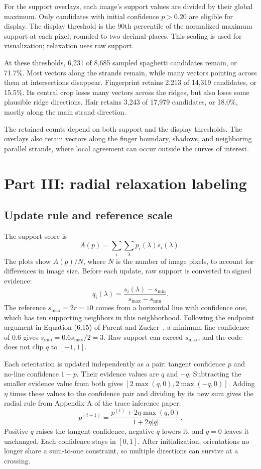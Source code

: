 \documentclass[10pt,letterpaper]{article}
\begin{document}
For the support overlays, each image's support values are divided by their
global maximum. Only candidates with initial confidence $p>0.20$ are eligible
for display. The display threshold is the 90th percentile of the normalized
maximum support at each pixel, rounded to two decimal places. This scaling
is used for visualization; relaxation uses raw support.

At these thresholds, 6,231 of 8,685 sampled spaghetti candidates remain,
or 71.7\%. Most vectors along the strands remain, while many vectors pointing
across them at intersections disappear. Fingerprint retains 2,213 of 14,319
candidates, or 15.5\%. Its central crop loses many vectors across the ridges,
but also loses some plausible ridge directions. Hair retains 3,243 of 17,979
candidates, or 18.0\%, mostly along the main strand direction.

The retained counts depend on both support and the display thresholds.
The overlays also retain vectors along the finger boundary, shadows, and
neighboring parallel strands, where local agreement can occur outside the
curves of interest.

\section{Part III: radial relaxation labeling}
\subsection{Update rule and reference scale}
The support score is
\begin{equation}
A(p)=\sum_i\sum_\lambda p_i(\lambda)s_i(\lambda).
\end{equation}
The plots show $A(p)/N$, where $N$ is the number of image pixels, to account
for differences in image size. Before each update, raw support is converted
to signed evidence:
\begin{equation}
q_i(\lambda)=\frac{s_i(\lambda)-s_{\min}}{s_{\max}-s_{\min}}.
\end{equation}
The reference $s_{\max}=2r=10$ comes from a horizontal line with confidence
one, which has ten supporting neighbors in this neighborhood. Following the
endpoint argument in Equation (6.15) of Parent and Zucker~\cite{parent1989},
a minimum line confidence of $0.6$ gives $s_{\min}=0.6s_{\max}/2=3$.
Raw support can exceed $s_{\max}$, and the code does not clip $q$ to $[-1,1]$.

Each orientation is updated independently as a pair: tangent confidence $p$
and no-line confidence $1-p$. Their evidence values are $q$ and $-q$.
Subtracting the smaller evidence value from both gives
$[2\max(q,0),2\max(-q,0)]$. Adding $\eta$ times these values to the confidence
pair and dividing by its new sum gives the radial rule from Appendix A of
the trace inference paper:
\begin{equation}
p^{(t+1)}=\frac{p^{(t)}+2\eta\max(q,0)}{1+2\eta|q|}.
\label{eq:update}
\end{equation}
Positive $q$ raises the tangent confidence, negative $q$ lowers it, and
$q=0$ leaves it unchanged. Each confidence stays in $[0,1]$. After
initialization, orientations no longer share a sum-to-one constraint, so
multiple directions can survive at a crossing.
\end{document}
